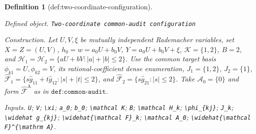 \documentclass{article}
\newtheorem{definition}{Definition}
\begin{document}
\begin{definition}[def:two-coordinate-configuration]\label{def:two-coordinate-configuration}
\par\smallskip\noindent\emph{Defined object.} \texttt{Two-\allowbreak{}coordinate common-\allowbreak{}audit configuration}
\par\smallskip\noindent\emph{Construction.} Let \(U,V,\xi\) be mutually independent Rademacher variables, set \(X=Z=(U,V)\), \(h_0=w=a_0U+b_0V\), \(Y=a_0U+b_0V+\xi\), \(\mathcal K=\{1,2\}\), \(B=2\), and \(\mathcal H_1=\mathcal H_2=\{aU+bV:|a|+|b|\le2\}\). Use the common target basis \(\phi_{k1}=U,\phi_{k2}=V\), its rational-coefficient dense enumeration, \(J_1=\{1,2\}\), \(J_2=\{1\}\), \(\widehat{\mathcal F}_1=\{s\widehat g_{11}+t\widehat g_{12}:|s|+|t|\le2\}\), and \(\widehat{\mathcal F}_2=\{s\widehat g_{21}:|s|\le2\}\). Take \(\mathcal A_0=\{0\}\) and form \(\widehat{\mathcal F}^{\mathrm A}\) as in \(\texttt{def:common-audit}\).
\par\smallskip\noindent\emph{Inputs.} \texttt{U}; \texttt{V}; \texttt{\textbackslash{}\allowbreak{}xi}; \texttt{a\_\allowbreak{}0}; \texttt{b\_\allowbreak{}0}; \texttt{\textbackslash{}\allowbreak{}mathcal K}; \texttt{B}; \texttt{\textbackslash{}\allowbreak{}mathcal H\_\allowbreak{}k}; \texttt{\textbackslash{}\allowbreak{}phi\_\allowbreak{}\{kj\}\allowbreak{}}; \texttt{J\_\allowbreak{}k}; \texttt{\textbackslash{}\allowbreak{}widehat g\_\allowbreak{}\{kj\}\allowbreak{}}; \texttt{\textbackslash{}\allowbreak{}widehat\{\textbackslash{}\allowbreak{}mathcal F\}\allowbreak{}\_\allowbreak{}k}; \texttt{\textbackslash{}\allowbreak{}mathcal A\_\allowbreak{}0}; \texttt{\textbackslash{}\allowbreak{}widehat\{\textbackslash{}\allowbreak{}mathcal F\}\allowbreak{}\textasciicircum{}\{\textbackslash{}\allowbreak{}mathrm A\}\allowbreak{}}.
\end{definition}
\end{document}
